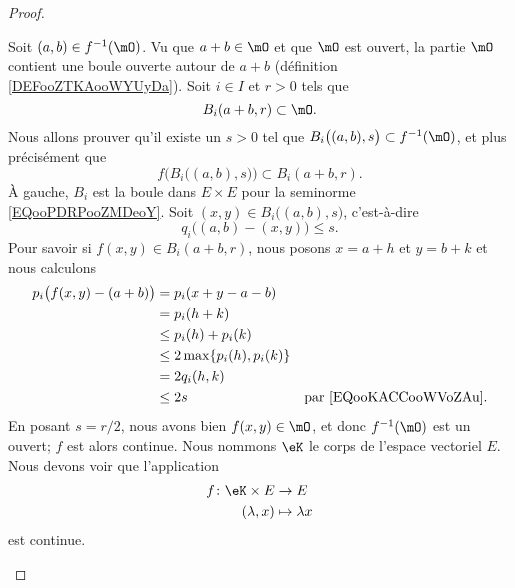 \begin{proof}
\begin{subproof}
		Soit \( (a,b)\in f^{-1}(\mO)\). Vu que \( a+b\in \mO\) et que \( \mO\) est ouvert, la partie \( \mO\) contient une boule ouverte autour de \( a+b\) (définition \ref{DEFooZTKAooWYUyDa}). Soit \( i\in I\) et \( r>0\) tels que
		\begin{equation}
			B_i(a+b,r)\subset \mO.
		\end{equation}
		Nous allons prouver qu'il existe un \( s>0\) tel que \( B_i\big( (a,b),s \big)\subset f^{-1}(\mO)\), et plus précisément que
		\begin{equation}
			f\Big( B_i\big( (a,b),s \big) \Big)\subset B_i(a+b,r).
		\end{equation}
		À gauche, \( B_i\) est la boule dans \( E\times E\) pour la seminorme \eqref{EQooPDRPooZMDeoY}. Soit \( (x,y)\in B_i\big( (a,b),s \big)\), c'est-à-dire
		\begin{equation}    \label{EQooKACCooWVoZAu}
			q_i\big( (a,b)-(x,y) \big)\leq s.
		\end{equation}
		Pour savoir si \( f(x,y)\in B_i(a+b,r)\), nous posons \( x=a+h\) et \( y=b+k\) et nous calculons
		\begin{subequations}
			\begin{align}
				p_i\big( f(x,y)-(a+b) \big) & =p_i(x+y-a-b)                                                        \\
				                            & =p_i(h+k)                                                            \\
				                            & \leq p_i(h)+p_i(k)                                                   \\
				                            & \leq 2\max\{ p_i(h),p_i(k) \}                                        \\
				                            & =2q_i(h,k)                                                           \\
				                            & \leq 2s                       & \text{par \eqref{EQooKACCooWVoZAu}.}
			\end{align}
		\end{subequations}
		En posant \( s=r/2\), nous avons bien \( f(x,y)\in \mO\), et donc \( f^{-1}(\mO)\) est un ouvert; \( f\) est alors continue.
		\spitem[Produit]
		Nous nommons \( \eK\) le corps de l'espace vectoriel \( E\). Nous devons voir que l'application
		\begin{equation}
			\begin{aligned}
				f\colon \eK\times E & \to E             \\
				(\lambda,x)         & \mapsto \lambda x
			\end{aligned}
		\end{equation}
		est continue.


\end{subproof}
\end{proof}
